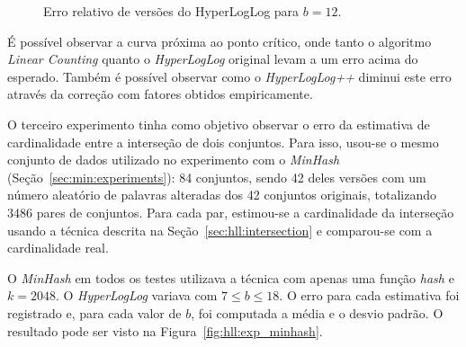 \begin{figure}[!htbp]
\centering
{}
\caption{Erro relativo de versões do HyperLogLog para $b=12$.}
\label{fig:hll:exp_plusplus}
\end{figure}
    
É possível observar a curva próxima ao ponto crítico, onde tanto o algoritmo \emph{Linear Counting} quanto o \emph{HyperLogLog} original levam a um erro acima do esperado. Também é possível observar como o \emph{HyperLogLog++} diminui este erro através da correção com fatores obtidos empiricamente.

O terceiro experimento tinha como objetivo observar o erro da estimativa de cardinalidade entre a interseção de dois conjuntos. Para isso, usou-se o mesmo conjunto de dados utilizado no experimento com o \emph{MinHash} (Seção~\ref{sec:min:experiments}): 84 conjuntos, sendo 42 deles versões com um número aleatório de palavras alteradas dos 42 conjuntos originais, totalizando 3486 pares de conjuntos. Para cada par, estimou-se a cardinalidade da interseção usando a técnica descrita na Seção~\ref{sec:hll:intersection} e comparou-se com a cardinalidade real. 

O \emph{MinHash} em todos os testes utilizava a técnica com apenas uma função \emph{hash} e $k = 2048$. O \emph{HyperLogLog} variava com $7 \leq b \leq 18$. O erro para cada estimativa foi registrado e, para cada valor de $b$, foi computada a média e o desvio padrão. O resultado pode ser visto na Figura~\ref{fig:hll:exp_minhash}.


